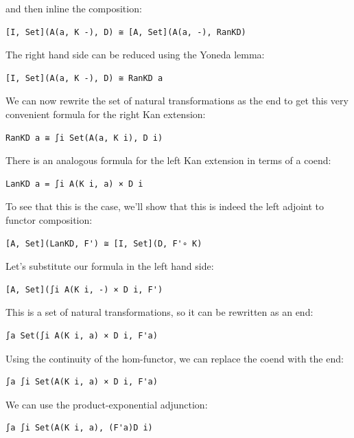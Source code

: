 and then inline the composition:

\begin{verbatim}
[I, Set](A(a, K -), D) ≅ [A, Set](A(a, -), RanKD)
\end{verbatim}

The right hand side can be reduced using the Yoneda lemma:

\begin{verbatim}
[I, Set](A(a, K -), D) ≅ RanKD a
\end{verbatim}

We can now rewrite the set of natural transformations as the end to get
this very convenient formula for the right Kan extension:

\begin{verbatim}
RanKD a ≅ ∫i Set(A(a, K i), D i)
\end{verbatim}

There is an analogous formula for the left Kan extension in terms of a
coend:

\begin{verbatim}
LanKD a = ∫i A(K i, a) × D i
\end{verbatim}

To see that this is the case, we'll show that this is indeed the left
adjoint to functor composition:

\begin{verbatim}
[A, Set](LanKD, F') ≅ [I, Set](D, F'∘ K)
\end{verbatim}

Let's substitute our formula in the left hand side:

\begin{verbatim}
[A, Set](∫i A(K i, -) × D i, F')
\end{verbatim}

This is a set of natural transformations, so it can be rewritten as an
end:

\begin{verbatim}
∫a Set(∫i A(K i, a) × D i, F'a)
\end{verbatim}

Using the continuity of the hom-functor, we can replace the coend with
the end:

\begin{verbatim}
∫a ∫i Set(A(K i, a) × D i, F'a)
\end{verbatim}

We can use the product-exponential adjunction:

\begin{verbatim}
∫a ∫i Set(A(K i, a), (F'a)D i)
\end{verbatim}

